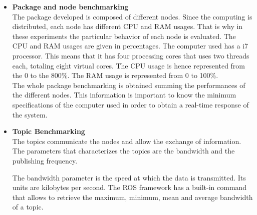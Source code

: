 	\begin{itemize}


		\item{\textbf{Package and node benchmarking}}
		\\
		The package developed is composed of different nodes. 
		Since the computing is distributed, each node has different CPU and RAM usages.
		That is why in these experiments the particular behavior of each node is evaluated. 
		The CPU and RAM usages are given in percentages. 
		The computer used has a i7 processor. 
		This means that it has four processing cores that uses two threads each, totaling eight virtual cores. 
		The CPU usage is hence represented from the 0 to the 800\%.
		The RAM usage is represented from 0 to 100\%.
		\\[0.5cm]

		The whole package benchmarking is obtained summing the performances of the different nodes. 
		This information is important to know the minimum specifications of the computer used in order to obtain a real-time response of the system.  




		\item{\textbf{Topic Benchmarking}}\\
		The topics communicate the nodes and allow the exchange of information. 
		The parameters that characterizes the topics are the bandwidth and the publishing frequency.
	
		The bandwidth parameter is the speed at which the data is transmitted. 
		Its units are kilobytes per second. 
		The ROS framework has a built-in command that allows to retrieve the maximum, minimum, mean and average bandwidth of a topic. 


\end{itemize}
